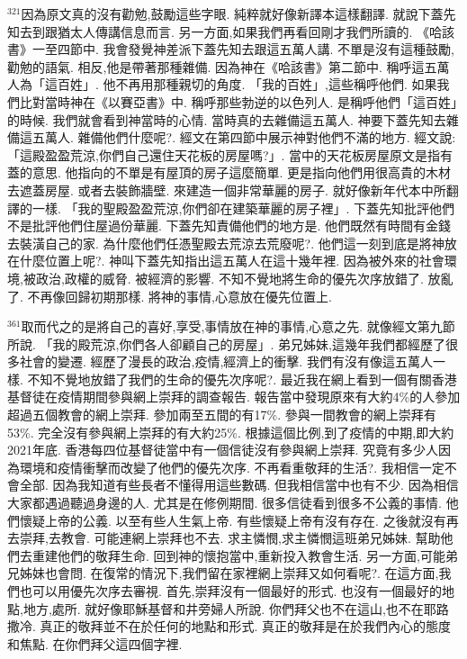 \documentclass{book}
\begin{document}
$^{321}$因為原文真的沒有勸勉,鼓勵這些字眼.
純粹就好像新譯本這樣翻譯.
就說下蓋先知去到跟猶太人傳講信息而言.
另一方面,如果我們再看回剛才我們所讀的.
《哈該書》一至四節中.
我會發覺神差派下蓋先知去跟這五萬人講.
不單是沒有這種鼓勵,勸勉的語氣.
相反,他是帶著那種雜備.
因為神在《哈該書》第二節中.
稱呼這五萬人為「這百姓」.
他不再用那種親切的角度.
「我的百姓」,這些稱呼他們.
如果我們比對當時神在《以賽亞書》中.
稱呼那些勃逆的以色列人.
是稱呼他們「這百姓」的時候.
我們就會看到神當時的心情.
當時真的去雜備這五萬人.
神要下蓋先知去雜備這五萬人.
雜備他們什麼呢?.
經文在第四節中展示神對他們不滿的地方.
經文說:「這殿盈盈荒涼,你們自己還住天花板的房屋嗎?」.
當中的天花板房屋原文是指有蓋的意思.
他指向的不單是有屋頂的房子這麼簡單.
更是指向他們用很高貴的木材去遮蓋房屋.
或者去裝飾牆壁.
來建造一個非常華麗的房子.
就好像新年代本中所翻譯的一樣.
「我的聖殿盈盈荒涼,你們卻在建築華麗的房子裡」.
下蓋先知批評他們不是批評他們住屋過份華麗.
下蓋先知責備他們的地方是.
他們既然有時間有金錢去裝潢自己的家.
為什麼他們任憑聖殿去荒涼去荒廢呢?.
他們這一刻到底是將神放在什麼位置上呢?.
神叫下蓋先知指出這五萬人在這十幾年裡.
因為被外來的社會環境,被政治,政權的威脅.
被經濟的影響.
不知不覺地將生命的優先次序放錯了.
放亂了.
不再像回歸初期那樣.
將神的事情,心意放在優先位置上.

$^{361}$取而代之的是將自己的喜好,享受,事情放在神的事情,心意之先.
就像經文第九節所說.
「我的殿荒涼,你們各人卻顧自己的房屋」.
弟兄姊妹,這幾年我們都經歷了很多社會的變遷.
經歷了漫長的政治,疫情,經濟上的衝擊.
我們有沒有像這五萬人一樣.
不知不覺地放錯了我們的生命的優先次序呢?.
最近我在網上看到一個有關香港基督徒在疫情期間參與網上崇拜的調查報告.
報告當中發現原來有大約4\%的人參加超過五個教會的網上崇拜.
參加兩至五間的有17\%.
參與一間教會的網上崇拜有53\%.
完全沒有參與網上崇拜的有大約25\%.
根據這個比例,到了疫情的中期,即大約2021年底.
香港每四位基督徒當中有一個信徒沒有參與網上崇拜.
究竟有多少人因為環境和疫情衝擊而改變了他們的優先次序.
不再看重敬拜的生活?.
我相信一定不會全部.
因為我知道有些長者不懂得用這些數碼.
但我相信當中也有不少.
因為相信大家都遇過聽過身邊的人.
尤其是在修例期間.
很多信徒看到很多不公義的事情.
他們懷疑上帝的公義.
以至有些人生氣上帝.
有些懷疑上帝有沒有存在.
之後就沒有再去崇拜,去教會.
可能連網上崇拜也不去.
求主憐憫,求主憐憫這班弟兄姊妹.
幫助他們去重建他們的敬拜生命.
回到神的懷抱當中,重新投入教會生活.
另一方面,可能弟兄姊妹也會問.
在復常的情況下,我們留在家裡網上崇拜又如何看呢?.
在這方面,我們也可以用優先次序去審視.
首先,崇拜沒有一個最好的形式.
也沒有一個最好的地點,地方,處所.
就好像耶穌基督和井旁婦人所說.
你們拜父也不在這山,也不在耶路撒冷.
真正的敬拜並不在於任何的地點和形式.
真正的敬拜是在於我們內心的態度和焦點.
在你們拜父這四個字裡.
\end{document}
